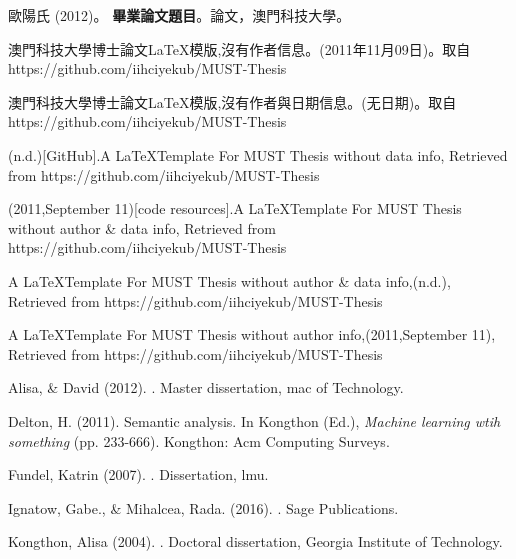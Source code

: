 \begin{thebibliography}{}
歐陽氏 (2012)。
\newblock \textbf{畢業論文題目}。論文，澳門科技大學。

澳門科技大學博士論文\LaTeX 模版,沒有作者信息。(2011年11月09日)。取自 https://github.com/iihciyekub/MUST-Thesis

澳門科技大學博士論文\LaTeX 模版,沒有作者與日期信息。(无日期)。取自 https://github.com/iihciyekub/MUST-Thesis


\iiname(n.d.)[GitHub].A \LaTeX Template For MUST Thesis without data info, Retrieved from https://github.com/iihciyekub/MUST-Thesis

\iiname(2011,September 11)[code resources].A \LaTeX Template For MUST Thesis without author \& data info, Retrieved from https://github.com/iihciyekub/MUST-Thesis

A \LaTeX Template For MUST Thesis without author \& data info,(n.d.), Retrieved from https://github.com/iihciyekub/MUST-Thesis

A \LaTeX Template For MUST Thesis without author info,(2011,September 11), Retrieved from https://github.com/iihciyekub/MUST-Thesis

Alisa, \& David (2012).
. Master dissertation,  mac of Technology.

Delton, H. (2011).
\newblock  Semantic analysis. In Kongthon (Ed.), {\em Machine learning wtih something} (pp. 233-666). Kongthon: Acm Computing Surveys.

Fundel, Katrin (2007).
. Dissertation, lmu.

Ignatow, Gabe., \& Mihalcea, Rada. (2016).
. Sage Publications.

Kongthon, Alisa (2004).
. Doctoral dissertation, Georgia Institute of Technology.


\end{thebibliography}
